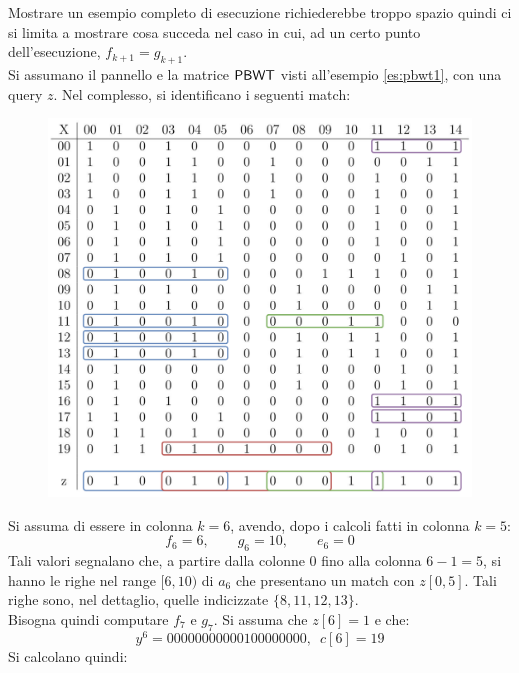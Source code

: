 \begin{esempio}
  \label{es:algo5}
  Mostrare un esempio completo di esecuzione richiederebbe troppo spazio quindi
  ci si limita a mostrare cosa succeda nel caso in cui, ad un certo punto
  dell'esecuzione, $f_{k+1}=g_{k+1}$.\\
  Si assumano il pannello e la matrice $\mbox{\rm {\sf PBWT}}$ visti all'esempio
  \ref{es:pbwt1}, con una query $z$. Nel complesso, si identificano i
  seguenti match:
  \begin{figure}[H]
    \centering
    \includegraphics[scale = 0.365]{img/pbwtmatch.pdf}
  \end{figure}
  Si assuma di essere in colonna $k=6$, avendo, dopo i calcoli fatti in colonna
  $k=5$:
  \[f_6=6,\quad\quad g_6=10,\quad\quad e_6=0\]
  Tali valori segnalano che, a partire dalla colonne $0$ fino alla colonna
  $6-1=5$, si 
  hanno le righe nel range $[6,10)$ di $a_{6}$ che presentano un match con
  $z[0,5]$. Tali 
  righe sono, nel dettaglio, quelle indicizzate $\{8, 11, 12, 13\}$.\\
  Bisogna quindi computare $f_7$ e $g_7$. Si assuma che $z[6]=1$ e che:
  \[y^6=00000000000100000000,\,\,\,c[6]=19\]
  Si calcolano quindi:

\end{esempio}
